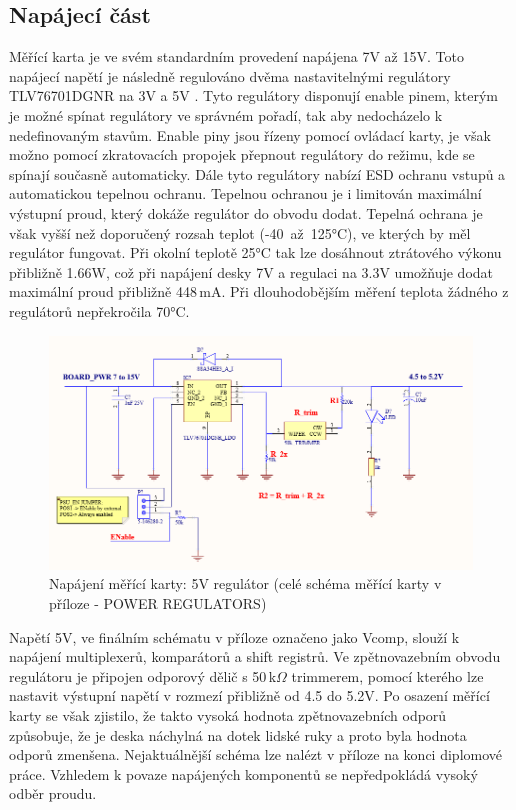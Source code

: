 \subsection{Napájecí část} \label{section: REGULATOR_POWER}
Měřící karta je ve svém
standardním provedení napájena 7V až 15V.
Toto napájecí napětí je následně regulováno
dvěma nastavitelnými regulátory TLV76701DGNR na 3V a 5V .
Tyto regulátory disponují enable pinem, kterým je možné spínat regulátory ve správném pořadí,
tak aby nedocházelo k nedefinovaným stavům. Enable piny jsou řízeny pomocí ovládací karty, je však možno
pomocí zkratovacích propojek přepnout regulátory do režimu, kde se spínají současně automaticky.
Dále tyto regulátory nabízí ESD ochranu vstupů a automatickou tepelnou ochranu. Tepelnou ochranou je i limitován maximální výstupní proud,
který dokáže regulátor do obvodu dodat. Tepelná ochrana je však vyšší než doporučený rozsah teplot \mbox{(-40 až 125°C)},
ve kterých by měl regulátor fungovat.
Při okolní teplotě 25°C tak lze dosáhnout ztrátového výkonu přibližně 1.66W,
což při napájení desky 7V a regulaci na 3.3V umožňuje dodat maximální proud přibližně 448\,mA.
Při dlouhodobějším měření teplota žádného z regulátorů nepřekročila 70°C.

\begin{figure}[ht!]
\centering
\includegraphics[width = 1\textwidth]{obrazky/PSU.png}
\caption{Napájení měřící karty: 5V regulátor (celé schéma měřící karty v příloze -  POWER REGULATORS)}
\label{Napájení měřící karty: 5V regulátor}
\end{figure}

Napětí 5V, ve finálním schématu v příloze označeno jako Vcomp,
slouží k napájení multiplexerů, komparátorů a shift registrů. Ve zpětnovazebním obvodu regulátoru
je připojen odporový dělič s 50\,k$\Omega$ trimmerem, pomocí kterého lze nastavit výstupní napětí v rozmezí
přibližně od 4.5 do 5.2V. Po osazení měřící karty se však zjistilo, že takto vysoká hodnota zpětnovazebních odporů způsobuje, že je deska
náchylná na dotek lidské ruky a proto byla hodnota odporů zmenšena. Nejaktuálnější schéma lze nalézt v příloze na konci diplomové práce.
Vzhledem k povaze napájených komponentů se nepředpokládá vysoký odběr proudu.\par

